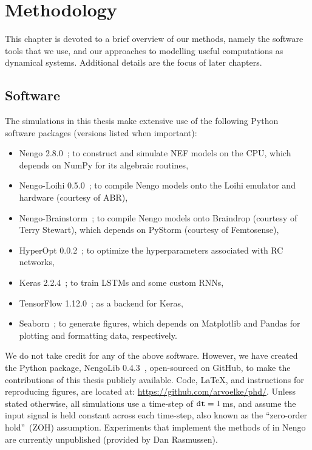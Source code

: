 \chapter{Methodology}
\label{chapt:methodology}

This chapter is devoted to a brief overview of our methods, namely the software tools that we use, and our approaches to modelling useful computations as dynamical systems.
Additional details are the focus of later chapters.

\section{Software}

The simulations in this thesis make extensive use of the following Python software packages (versions listed when important):
\begin{itemize}
\item Nengo 2.8.0~\citep{bekolay2014}; to construct and simulate NEF models on the CPU, which depends on NumPy for its algebraic routines,
\item Nengo-Loihi 0.5.0~\citep{blouw2018a, nengoloihi}; to compile Nengo models onto the Loihi emulator and hardware (courtesy of ABR),
\item Nengo-Brainstorm~\citep[pre-release;][]{neckar2018optimizing, braindrop2019}; to compile Nengo models onto Braindrop (courtesy of Terry Stewart), which depends on PyStorm (courtesy of Femtosense),
\item HyperOpt 0.0.2~\citep{bergstra2015hyperopt}; to optimize the hyperparameters associated with RC networks,
\item Keras 2.2.4~\citep{gulli2017deep}; to train LSTMs and some custom RNNs,
\item TensorFlow 1.12.0~\citep{abadi2016tensorflow}; as a backend for Keras,
\item Seaborn~\citep{michael_waskom_2015_19108}; to generate figures, which depends on Matplotlib and Pandas for plotting and formatting data, respectively.
\end{itemize}
We do not take credit for any of the above software.
However, we have created the Python package, NengoLib 0.4.3~\citep[][patent~pending]{dynamicspatent, nengolib}, open-sourced on GitHub, to make the contributions of this thesis publicly available.
Code, \LaTeX{}, and instructions for reproducing figures, are located at: \url{https://github.com/arvoelke/phd/}.
Unless stated otherwise, all simulations use a time-step of $\texttt{dt}{} = 1$\,ms, and assume the input signal is held constant across each time-step, also known as the ``zero-order hold''~(ZOH) assumption.
Experiments that implement the methods of \citet{boerlin2013predictive} in Nengo are currently unpublished (provided by Dan Rasmussen).

